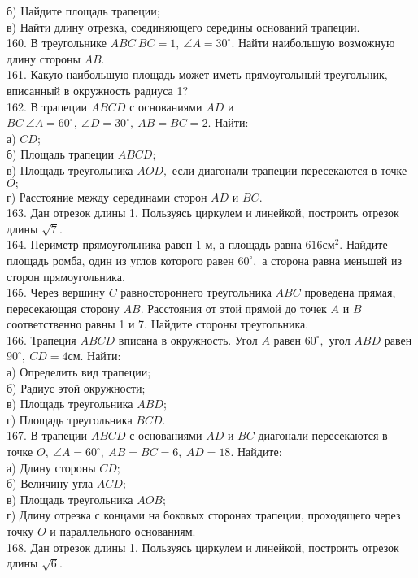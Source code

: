б) Найдите площадь трапеции;\\
в) Найти длину отрезка, соединяющего середины оснований трапеции.\\
160. В треугольнике $ABC\ BC=1,\ \angle A=30^\circ.$ Найти наибольшую возможную длину стороны $AB.$\\
161. Какую наибольшую площадь может иметь прямоугольный треугольник, вписанный в окружность радиуса 1?\\
162. В трапеции $ABCD$ с основаниями $AD$ и $BC\ \angle A=60^\circ,\ \angle D=30^\circ,\ AB=BC=2.$ Найти:\\
а) $CD;$\\
б) Площадь трапеции $ABCD;$\\
в) Площадь треугольника $AOD,$ если диагонали трапеции пересекаются в точке $O;$\\
г) Расстояние между серединами сторон $AD$ и $BC.$\\
163. Дан отрезок длины 1. Пользуясь циркулем и линейкой, построить отрезок длины $\sqrt{7}.$\\
164. Периметр прямоугольника равен 1 м, а площадь равна $616\text{см}^2.$ Найдите площадь ромба, один из углов которого равен $60^\circ,$ а сторона равна меньшей из сторон прямоугольника.\\
165. Через вершину $C$ равностороннего треугольника $ABC$ проведена прямая, пересекающая сторону $AB.$ Расстояния от этой прямой до точек $A$ и $B$ соответственно равны 1 и 7. Найдите стороны треугольника.\\
166. Трапеция $ABCD$ вписана в окружность. Угол $A$ равен $60^\circ,$ угол $ABD$ равен $90^\circ,\ CD=4$см. Найти:\\
а) Определить вид трапеции;\\
б) Радиус этой окружности;\\
в) Площадь треугольника $ABD;$\\
г) Площадь треугольника $BCD.$\\
167. В трапеции $ABCD$ с основаниями $AD$ и $BC$ диагонали пересекаются в точке $O,\ \angle A=60^\circ,\ AB=BC=6,\ AD=18.$ Найдите:\\
а) Длину стороны $CD;$\\
б) Величину угла $ACD;$\\
в) Площадь треугольника $AOB;$\\
г) Длину отрезка с концами на боковых сторонах трапеции, проходящего через точку $O$ и параллельного основаниям.\\
168. Дан отрезок длины 1. Пользуясь циркулем и линейкой, построить отрезок длины $\sqrt{6}.$\\
